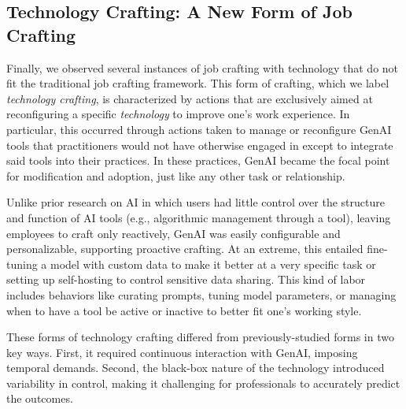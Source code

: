 \subsection{Technology Crafting: A New Form of Job Crafting}

Finally, we observed several instances of job crafting with technology that do not fit the traditional job crafting framework. This form of crafting, which we label \textit{technology crafting}, is characterized by actions that are exclusively aimed at reconfiguring a specific \textit{technology} to improve one's work experience. In particular, this occurred through actions taken to manage or reconfigure GenAI tools that practitioners would not have otherwise engaged in except to integrate said tools into their practices. In these practices, GenAI became the focal point for modification and adoption, just like any other task or relationship.

Unlike prior research on AI \cite{Perez2022} in which users had little control over the structure and function of AI tools (e.g., algorithmic management through a tool), leaving employees to craft only reactively, GenAI was easily configurable and personalizable, supporting proactive crafting. At an extreme, this entailed fine-tuning a model with custom data to make it better at a very specific task or setting up self-hosting to control sensitive data sharing. This kind of labor includes behaviors like curating prompts, tuning model parameters, or managing when to have a tool be active or inactive to better fit one's working style.

These forms of technology crafting differed from previously-studied forms in two key ways. First, it required continuous interaction with GenAI, imposing temporal demands. Second, the black-box nature of the technology introduced variability in control, making it challenging for professionals to accurately predict the outcomes.









